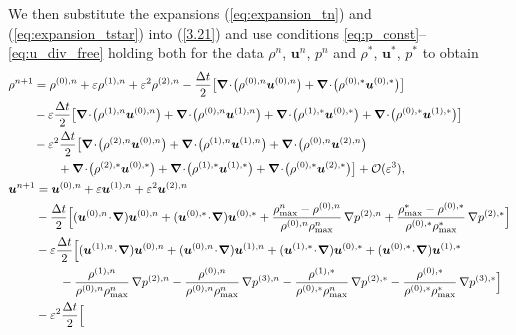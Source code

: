 \documentclass[A4paper,12pt,twoside]{article}
\newenvironment{proof}{{\flushleft \bf Proof:}}{}
\numberwithin{equation}{section}
\numberwithin{figure}{section}
\numberwithin{table}{section}
\def\bnabla{\bm{\nabla}}
\newcommand{\dt}{\Delta t}
\newcommand{\ve}{\varepsilon}
\newcommand\eref[1]{(\ref{#1})}
\begin{document}
\begin{proof}
%
We then substitute the expansions \eref{eq:expansion_tn} and \eref{eq:expansion_tstar} into \eref{3.21} and use conditions \eqref{eq:p_const}--\eqref{eq:u_div_free} holding both for the data $\rho^n$, $\bm u^n$, $p^n$ and $\rho^*$, $\bm u^*$, $p^*$
to obtain
\begin{align}
	&\begin{aligned}
		\rho^{n+1}&=\rho^{(0),n}+\ve \rho^{(1),n}+\ve^2 \rho^{(2),n}-\frac{\dt}{2}\big[ \bnabla\!\cdot\!\big(\rho^{(0),n}\bm u^{(0),n}\big) + \bnabla\!\cdot\!\big(\rho^{(0),*}\bm u^{(0),*}\big) \big]\\
		&-\ve \frac{\dt}{2} \big[\bnabla\!\cdot\!\big(\rho^{(1),n}\bm u^{(0),n}\big)+\bnabla\!\cdot\!\big(\rho^{(0),n}\bm u^{(1),n}\big)+\bnabla\!\cdot\!\big(\rho^{(1),*}\bm u^{(0),*}\big)+\bnabla\!\cdot\!\big(\rho^{(0),*}\bm u^{(1),*}\big)\big]\\
		&-\ve^2 \frac{\dt}{2} \big[\bnabla\!\cdot\!\big(\rho^{(2),n}\bm u^{(0),n}\big)+\bnabla\!\cdot\!\big(\rho^{(1),n}\bm u^{(1),n}\big)+\bnabla\!\cdot\!\big(\rho^{(0),n}\bm u^{(2),n}\big) \\
		&\qquad+\bnabla\!\cdot\!\big(\rho^{(2),*}\bm u^{(0),*}\big)+\bnabla\!\cdot\!\big(\rho^{(1),*}\bm u^{(1),*}\big)+\bnabla\!\cdot\!\big(\rho^{(0),*}\bm u^{(2),*}\big)\big]+{\cal O}(\ve^3),\label{3.24}
	\end{aligned}\\
	&\begin{aligned}
		\bm u^{n+1}&=\bm u^{(0),n}+\ve \bm u^{(1),n}+\ve^2 \bm u^{(2),n}\\
		&-\frac{\dt}{2} \Big[(\bm u^{(0),n}\!\cdot\!\bnabla)\bm u^{(0),n}+
		(\bm u^{(0),*}\!\cdot\!\bnabla)\bm u^{(0),*}+\frac{\rho_{\max}^n-\rho^{(0),n}}{\rho^{(0),n}\rho_{\max}^n}\,\nabla p^{(2),n}+\frac{\rho_{\max}^*-\rho^{(0),*}}{\rho^{(0),*}\rho_{\max}^*}\,\nabla p^{(2),*} \Big]
		\\&-\ve\frac{\dt}{2} \Big[(\bm u^{(1),n}\!\cdot\!\bnabla)\bm u^{(0),n}+(\bm u^{(0),n}\!\cdot\!\bnabla)\bm u^{(1),n}+(\bm u^{(1),*}\!\cdot\!\bnabla)\bm u^{(0),*}+(\bm u^{(0),*}\!\cdot\!\bnabla)\bm u^{(1),*}\\
		&\qquad-\frac{\rho^{(1),n}}{\rho^{(0),n}\rho_{\max}^n}\,\nabla p^{(2),n}-\frac{\rho^{(0),n}}{\rho^{(0),n}\rho_{\max}^n}\,\nabla p^{(3),n}
		-\frac{\rho^{(1),*}}{\rho^{(0),*}\rho_{\max}^n}\,\nabla p^{(2),*}-\frac{\rho^{(0),*}}{\rho^{(0),*}\rho_{\max}^*}\,\nabla p^{(3),*}\Big]\\
		&-\ve^2\frac{\dt}{2} \Big[

\end{aligned}
\end{align}
\end{proof}
\end{document}
